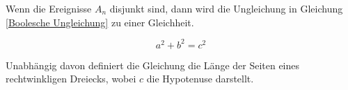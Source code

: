 

Wenn die Ereignisse $A_n$ disjunkt sind, dann wird die Ungleichung
in Gleichung \autoref{Boolesche Ungleichung} zu einer Gleichheit. 

\begin{equation}
  a^2+b^2=c^2
\end{equation}

Unabhängig davon definiert die Gleichung die Länge der Seiten eines rechtwinkligen Dreiecks, wobei $c$ die Hypotenuse darstellt. 
